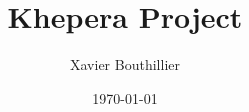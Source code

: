 \begin{titlepage}

\title{Khepera Project}
\date{\today}
\author{Xavier Bouthillier}

\maketitle

\end{titlepage}
